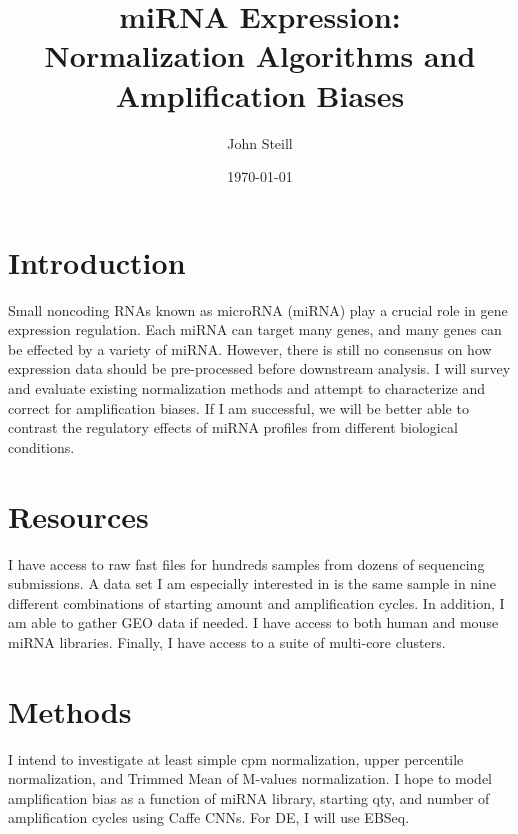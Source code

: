 \documentclass[dvips,12pt]{article}
\begin{document}

\title{miRNA Expression:\\ Normalization Algorithms and Amplification Biases}
\author{John Steill}
\date{\today}


\maketitle


\section{Introduction}

Small noncoding RNAs known as microRNA (miRNA) play a crucial role in gene expression regulation. Each miRNA can target many genes, and many genes can be effected by a variety of miRNA\cite{Dong}.  However, there is still no consensus on how expression data should be pre-processed before downstream analysis.\cite{tam} I will survey and evaluate existing normalization methods and attempt to characterize and correct for amplification biases. If I am successful, we will be better able to contrast the regulatory effects of miRNA profiles from different biological conditions. 

\section{Resources}
I have access to raw fast files for hundreds samples from dozens of sequencing submissions. A data set I am especially interested in is the same sample in nine different combinations of starting amount and amplification cycles.
In addition, I am able to gather GEO data if needed. I have access to both human and mouse miRNA libraries. Finally, I have access to a suite of multi-core clusters. 

\section{Methods}
I intend to investigate at least simple cpm normalization, upper percentile normalization\cite{bullard}, and Trimmed Mean of M-values \cite{Robinson} normalization. I hope to
model amplification bias as a function of miRNA library, starting qty, and number of amplification cycles using Caffe CNNs\cite{Jia}. For
DE, I will use EBSeq.\cite{Leng}
\end{document}
